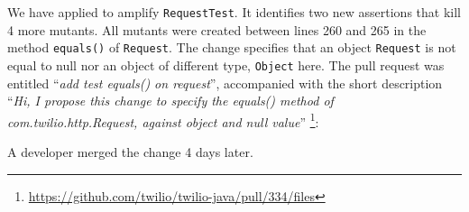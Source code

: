 We have applied \dspot to amplify \texttt{RequestTest}. It identifies two new assertions that kill 4 more mutants. All mutants were created between lines 260 and 265 in the method \texttt{equals()} of \texttt{Request}. The change specifies that an object \texttt{Request} is not equal to null nor an object of different type, \ie \texttt{Object} here. The pull request was entitled ``\emph{add test equals() on request}'', accompanied with the short description ``\emph{Hi, I propose this change to specify the equals() method of com.twilio.http.Request, against object and null value}'' \footnote{\url{https://github.com/twilio/twilio-java/pull/334/files}}:
\begin{figure}[H]
	\centering{}
\end{figure}

A developer merged the change 4 days later.

